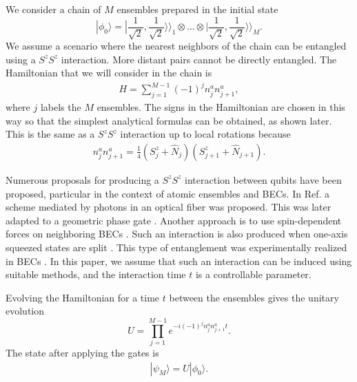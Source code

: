\documentclass[%
  prx,%
  twocolumn,%
  preprintnumbers,%
  amsmath,%
  amssymb,%
  superscriptaddress%
]{revtex4}
\begin{document}
We consider a chain of $ M $ ensembles prepared in the initial state
%
%
\begin{equation}
|\phi_0 \rangle=|\frac{1}{\sqrt{2}},\frac{1}{\sqrt{2}}\rangle\rangle_{1}\otimes\dots\otimes|\frac{1}{\sqrt{2}},\frac{1}{\sqrt{2}}\rangle\rangle_{M} .  \label{initstate}
\end{equation}
%
We assume a scenario where the nearest neighbors of the chain can be entangled using a $ S^z S^z $  interaction. More distant pairs cannot be directly entangled.  The Hamiltonian that we will consider in the chain is
%
\begin{align}
H=  \sum_{j=1}^{M-1} (-1)^j n_j^a n_{j+1}^a ,
\label{mainham}
\end{align}
%
where $ j$ labels the  $M $ ensembles. The signs in the Hamiltonian are chosen in this way so that the simplest analytical formulas can be obtained, as shown later.
 This is the same as a $ S^z S^z $ interaction up to local rotations because
%
\begin{align}
n^a_j n_{j+1}^a = \frac{1}{4} (S^z_j + \hat{N}_j) (S^z_{j+1} + \hat{N}_{j+1} ).
\end{align}

Numerous proposals for producing a $ S^z S^z $ interaction between qubits have been proposed, particular in the context of atomic ensembles and BECs.  In Ref. \cite{pyrkov2013entanglement} a scheme mediated by photons in an optical fiber was proposed.  This was later adapted to a geometric phase gate \cite{hussain2014geometric}. Another approach is to use spin-dependent forces on neighboring BECs \cite{treutlein2006}.
Such an interaction is also produced when one-axis squeezed states are split \cite{Jing_2019}.  This type of entanglement was  experimentally realized in BECs \cite{fadel2018spatial,Colciaghi2023}.  In this paper, we assume that such an interaction can be induced using suitable methods, and the interaction time $ t $ is a controllable parameter.

Evolving the Hamiltonian for a time $ t $ between the ensembles gives the unitary evolution
%
\begin{equation}
U=\prod^{M-1}_{j=1} e^{- i (-1)^j  n^a_j n^a_{j+1} t} .
\end{equation}
%
The state after applying the gates is
%
\begin{align}
|\psi_M \rangle = U | \phi_0 \rangle .
\end{align}
\end{document}
